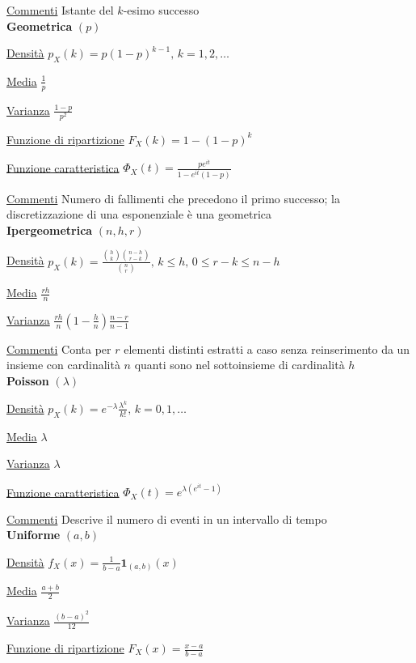 \documentclass[openany]{book} %
\begin{document}
\begin{multicols}{2}
\underline{Commenti} Istante del $k$-esimo successo
\\

\textbf{Geometrica} $(p)$

\underline{Densità} $p_X(k) = p(1-p)^{k-1}, \, k =1,2,\dots$

\underline{Media} $\frac{1}{p}$

\underline{Varianza} $\frac{1-p}{p^2}$

\underline{Funzione di ripartizione} $F_X(k)=1-(1-p)^k$

\underline{Funzione caratteristica} $\Phi_X(t)= \frac{pe^{it}}{1-e^{it}(1-p)}$

\underline{Commenti} Numero di fallimenti che precedono il primo successo; la discretizzazione di una esponenziale è una geometrica
\\

\textbf{Ipergeometrica} $(n,h,r)$

\underline{Densità} $p_X(k) = \frac{\binom {h}{k}\binom {n-h}{r-k}}{\binom {n}{r}},\,k\leq h,\,0\leq r-k\leq n-h$

\underline{Media} $\frac{rh}{n}$

\underline{Varianza} $\frac{rh}{n}\left(1-\frac{h}{n}\right)\frac{n-r}{n-1}$

\underline{Commenti} Conta per $r$ elementi distinti estratti a caso senza reinserimento da un insieme con cardinalità $n$ quanti sono nel sottoinsieme di cardinalità $h$
\\

\textbf{Poisson} $(\lambda)$

\underline{Densità} $p_X(k) = e^{-\lambda}\frac{\lambda^k}{k!},\,k=0,1,\dots$

\underline{Media} $\lambda$

\underline{Varianza} $\lambda$

\underline{Funzione caratteristica} $\Phi_X(t)=e^{\lambda(e^{it}-1)}$

\underline{Commenti} Descrive il numero di eventi in un intervallo di tempo
\\

\textbf{Uniforme} $(a,b)$

\underline{Densità} $f_X(x) = \frac{1}{b-a}\boldsymbol{1}_{(a,b)}(x)$

\underline{Media} $\frac{a+b}{2}$

\underline{Varianza} $\frac{(b-a)^2}{12}$

\underline{Funzione di ripartizione} $F_X(x)=\frac{x-a}{b-a}$


\end{multicols}
\end{document}
